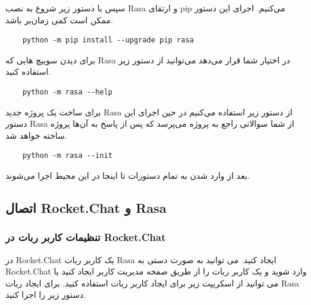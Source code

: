 سپس با دستور زیر شروع به نصب Rasa و ارتقای pip می‌کنیم. اجرای این دستور ممکن است کمی زمان‌بر باشد.

\begin{latin}
    \begin{verbatim}
    python -m pip install --upgrade pip rasa
    \end{verbatim}
\end{latin}

برای دیدن سوییچ هایی که Rasa در اختیار شما قرار می‌دهد می‌توانید از دستور زیر استفاده کنید.

\begin{latin}
    \begin{verbatim}
    python -m rasa --help
    \end{verbatim}
\end{latin}

برای ساخت یک پروژه جدید Rasa از دستور زیر استفاده می‌کنیم در حین اجرای این دستور Rasa از شما سوالاتی راجع به پروژه می‌پرسد که پس از پاسخ به آن‌ها پروژه ساخته خواهد شد.

\begin{latin}
    \begin{verbatim}
    python -m rasa --init
    \end{verbatim}
\end{latin}

بعد از وارد شدن به  تمام دستورات تا اینجا در این محیط اجرا می‌شوند.

\subsection{اتصال Rocket.Chat و Rasa}

\subsubsection{تنظیمات کاربر ربات در Rocket.Chat}

در Rocket.Chat یک کاربر ربات Rasa ایجاد کنید. می توانید به صورت دستی به Rocket.Chat وارد شوید و یک کاربر ربات را از طریق صفحه مدیریت کاربر ایجاد کنید یا می توانید از اسکریپت زیر برای ایجاد کاربر ربات استفاده کنید.
برای ایجاد ربات Rasa دستور زیر را اجرا کنید.

